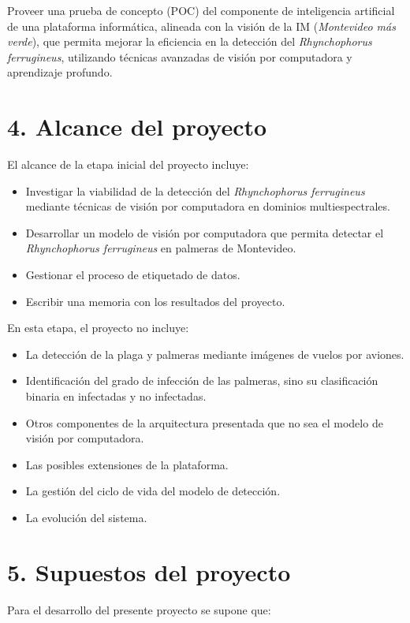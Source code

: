 \documentclass[
11pt, %
]{charter}
\begin{document}
Proveer una prueba de concepto (POC) del componente de inteligencia artificial de una plataforma informática, alineada con la visión de la IM (\textit{Montevideo más verde}), que permita mejorar la eficiencia en la detección del \textit{Rhynchophorus ferrugineus}, utilizando técnicas avanzadas de visión por computadora y aprendizaje profundo.

\section{4. Alcance del proyecto}
\label{sec:alcance}

El alcance de la etapa inicial del proyecto incluye:
\begin{itemize}
  \item Investigar la viabilidad de la detección del \textit{Rhynchophorus ferrugineus} mediante técnicas de visión por computadora en dominios multiespectrales.
  \item Desarrollar un modelo de visión por computadora que permita detectar el \textit{Rhynchophorus ferrugineus} en palmeras de Montevideo.
  \item Gestionar el proceso de etiquetado de datos.
  \item Escribir una memoria con los resultados del proyecto.
\end{itemize}

En esta etapa, el proyecto no incluye:
\begin{itemize}
  \item La detección de la plaga y palmeras mediante imágenes de vuelos por aviones.
  \item Identificación del grado de infección de las palmeras, sino su clasificación binaria en infectadas y no infectadas.
  \item Otros componentes de la arquitectura presentada que no sea el modelo de visión por computadora.
  \item Las posibles extensiones de la plataforma.
  \item La gestión del ciclo de vida del modelo de detección.
  \item La evolución del sistema.
\end{itemize}

\section{5. Supuestos del proyecto}
\label{sec:supuestos}


Para el desarrollo del presente proyecto se supone que:
\end{document}
